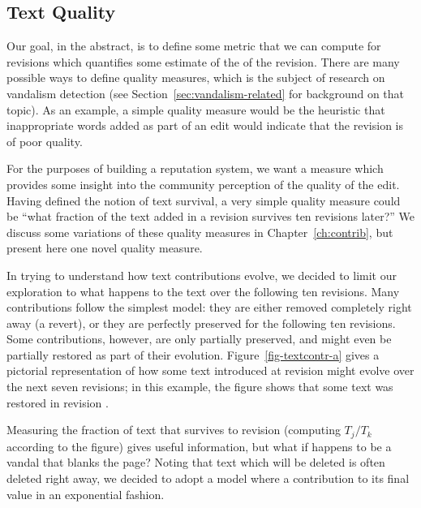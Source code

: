 \subsection{Text Quality}

Our goal, in the abstract, is to define some metric that we can compute for
revisions which quantifies some estimate of the  of the
revision.
There are many possible ways to define quality measures, which is the
subject of research on vandalism detection (see
Section~\ref{sec:vandalism-related} for background on that topic).
As an example, a simple quality measure would be the heuristic that
inappropriate words added as part of an edit would indicate that the revision
is of poor quality.

For the purposes of building a reputation system, we want a measure
which provides some insight into the community perception of the
quality of the edit.
Having defined the notion of text survival, a very simple quality measure
could be ``what fraction of the text added in a revision survives
ten revisions later?''
We discuss some variations of these quality measures in
Chapter~\ref{ch:contrib}, but present here one novel quality measure.

In trying to understand how text contributions evolve, we decided
to limit our exploration to what happens to the text over the
following ten revisions.
Many contributions follow the simplest model: they are either
removed completely right away (a revert), or they are perfectly
preserved for the following ten revisions.
Some contributions, however, are only partially preserved, and
might even be partially restored as part of their evolution.
Figure~\ref{fig-textcontr-a} gives a pictorial representation
of how some text introduced at revision  might
evolve over the next seven revisions; in this example, the
figure shows that some text was restored in revision .

Measuring the fraction of text that survives to revision 
(\eg computing $T_j / T_k$ according to the figure)
gives useful information, but what if  happens to be
a vandal that blanks the page?
Noting that text which will be deleted is often deleted right away,
we decided to adopt a model where a contribution 
to its final value in an exponential fashion.



